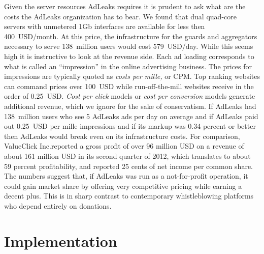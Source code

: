 \documentclass[twocolumn,10pt]{article}
\newcommand{\Kusers}{138}
\newcommand{\Uusers}{million}
\newcommand{\Kcpm}{0.25}
\newcommand{\Ucpm}{USD}
\newcommand{\Klowads}{5}
\newcommand{\Kunitmonth}{400}
\newcommand{\Uunitmonth}{USD/month}
\newcommand{\Kdailyusd}{579}
\newcommand{\Udailyusd}{USD/day}
\newcommand{\Kbreakeven}{0.34}
\newcommand{\Ubreakeven}{percent}
\begin{document}
Given the server resources AdLeaks requires it is prudent to ask what are
the costs the AdLeaks organization has to bear.  We found that dual
quad-core servers with unmetered 1Gb interfaces are available for less then
\Kunitmonth~\Uunitmonth.  At this price, the infrastructure for the guards
and aggregators necessary to serve \Kusers~\Uusers{} users would cost
\Kdailyusd~\Udailyusd{}.  While this seems high it is instructive to look at
the revenue side.  Each ad loading corresponds to what is called an
``impression'' in the online advertising business.  The prices for
impressions are typically quoted as \emph{costs per mille,} or CPM.  Top
ranking websites can command prices over 100~USD while run-off-the-mill
websites receive in the order of \Kcpm~\Ucpm.  \emph{Cost per click} models
or \emph{cost per conversion} models generate additional revenue, which we
ignore for the sake of conservatism.  If AdLeaks had \Kusers~\Uusers{} users
who see \Klowads{} AdLeaks ads per day on average and if AdLeaks paid out
\Kcpm~\Ucpm{} per mille impressions and if its markup was \Kbreakeven{}
\Ubreakeven{} or better then AdLeaks would break even on its infrastructure
costs.  For comparison, ValueClick Inc.\@ reported a gross profit of over 96
million USD on a revenue of about 161 million USD in its second quarter of
2012, which translates to about 59 percent profitability, and reported 25
cents of net income per common share.  The numbers suggest that, if AdLeaks
was run as a not-for-profit operation, it could gain market share by
offering very competitive pricing while earning a decent plus.  This is in
sharp contrast to contemporary whistleblowing platforms who depend entirely
on donations.


\section{Implementation}
\label{sec:impl}
\end{document}
